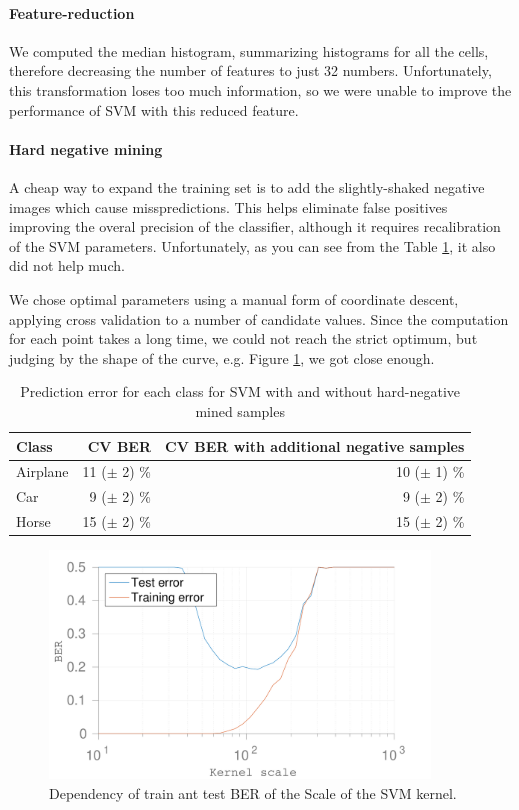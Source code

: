 \documentclass{article} %
\begin{document}
\paragraph{Feature-reduction} We computed the median histogram, summarizing histograms for all the cells, therefore decreasing the number of features to just 32 numbers. Unfortunately, this transformation loses too much information, so we were unable to improve the performance of SVM with this reduced feature.

\paragraph{Hard negative mining} A cheap way to expand the training set is to add the slightly-shaked negative images which cause misspredictions. This helps eliminate false positives improving the overal precision of the classifier, although it requires recalibration of the SVM parameters. Unfortunately, as you can see from the Table \ref{tbl:SVMerr}, it also did not help much.

We chose optimal parameters using a manual form of coordinate descent, applying cross validation to a number of candidate values. Since the computation for each point takes a long time, we could not reach the strict optimum, but judging by the shape of the curve, e.g. Figure \ref{fig:SVMKernelScaleBER}, we got close enough.

\begin{table}
  \centering
  \begin{tabular}{|l|r|r|}
    \hline
    Class & CV BER & CV BER with additional negative samples \\ \hline
    Airplane & 11 ($\pm$ 2) \% & 10 ($\pm$ 1) \% \\
    Car & 9 ($\pm$ 2) \% & 9 ($\pm$ 2) \% \\
    Horse & 15 ($\pm$ 2) \% & 15 ($\pm$ 2) \% \\
    \hline
  \end{tabular}
  \caption{Prediction error for each class for SVM with and without hard-negative mined samples}
  \label{tbl:SVMerr}
\end{table}


\begin{figure}[!t]
  \centering
  \includegraphics[width=0.9\textwidth]{figures/kernel_scale_ber.pdf}
  \caption{Dependency of train ant test BER of the Scale of the SVM kernel.}
  \label{fig:SVMKernelScaleBER}
\end{figure}
\end{document}
